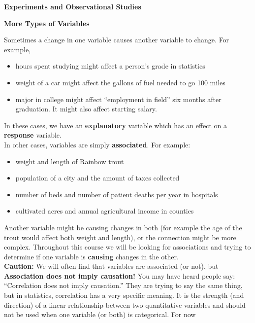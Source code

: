 \def\theTopic{Reading 8}

\begin{center}
  {\large\bf Experiments and Observational Studies}

  {\bf More Types of Variables}
\end{center}

Sometimes a change in one variable causes another variable to change. 
For example, \vspace{-.18in}
\begin{itemize}
\item hours spent studying might affect a person's
grade in statistics
\item weight of a car might affect the gallons of fuel needed to go 100 miles
\item major in college might affect ``employment in field'' six months
  after graduation. It might also affect starting salary.
\end{itemize}
In these cases, we have an {\bf explanatory} variable which has an
effect on a  {\bf response} variable.  \\
In other cases, variables are simply {\bf associated}.  For example: \vspace{-.18in}
\begin{itemize}
\item weight and length of Rainbow trout
\item population of a city and the amount of taxes collected
\item number of beds  and  number of patient deaths per year
  in  hospitals
\item cultivated acres and annual agricultural income  in  counties
\end{itemize}
Another variable might be causing changes in both (for example the age
of the trout would affect both weight and length), or the connection might be
more complex.  Throughout this course we will be looking for
associations and trying to determine if one variable is {\bf causing}
changes in the other.  \\
{\bf Caution:} We will often find that variables are associated (or
  not), but {\bf Association does not imply causation!}   You may have
  heard people say: ``Correlation does not imply causation.''  They
  are trying to say the same thing, but in statistics, correlation has
  a very specific meaning. It is the strength (and direction) of a
  linear relationship between two quantitative variables and should
  not be used when one variable (or both) is categorical.  For now
